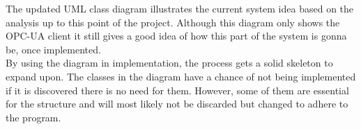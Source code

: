 The updated UML class diagram illustrates the current system idea based on the 
analysis up to this point of the project. Although this diagram only shows the 
OPC-UA client it still gives a good idea of how this part of the system is gonna 
be, once implemented. \\

By using the diagram in implementation, the process gets a solid skeleton to 
expand upon. The classes in the diagram have a chance of not being implemented 
if it is discovered there is no need for them. However, some of them are 
essential for the structure and will most likely not be discarded but changed to 
adhere to the program.